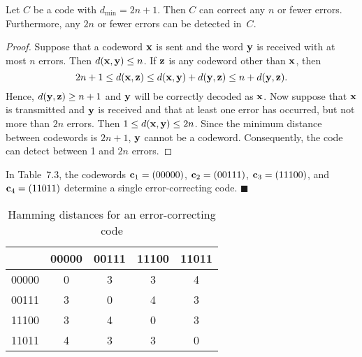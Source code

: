  
\begin{theorem}
Let $C$ be a code with $d_{\min} = 2n + 1$. Then $C$ can correct any
$n$ or fewer errors.  Furthermore, any $2n$ or fewer errors can be
detected in~$C$. 
\end{theorem}
 
 
\begin{proof}
Suppose that a codeword ${\bold x}$ is sent and the word ${\bold y}$
is received with at most $n$ errors. Then $d( {\bold x}, {\bold y})
\leq n$. If ${\bold z}$ is any codeword other than ${\bold x}$, then
\[
2n+1
\leq
d( {\bold x}, {\bold z})
\leq
d( {\bold x}, {\bold y}) + d( {\bold y}, {\bold z})
\leq
n + d( {\bold y}, {\bold z}).
\]
Hence, $d({\bold y}, {\bold z} ) \geq n+1$ and ${\bold y}$ will be
correctly decoded as ${\bold x}$. Now suppose that ${\bold x}$ is
transmitted and ${\bold y}$ is received and that at least one error 
has occurred, but not more than $2n$ errors. Then $1 \leq d( {\bold x},
{\bold y} ) \leq 2n$.  Since the minimum distance between codewords is
$2n +1$, ${\bold y}$ cannot be a codeword.  Consequently, the code can
detect between 1 and $2n$ errors. 
\end{proof}
 
 
\vspace{2ex}
 
 
In Table~7.3, the codewords ${\bold c}_1 = (00000)$, ${\bold c}_2 = (00111)$,
${\bold c}_3 = (11100)$, and ${\bold c}_4 = (11011)$ determine a
single error-correcting code.  
\hspace{\fill} $\blacksquare$
 
 
\begin{table}[htb]
\caption{ Hamming distances for an error-correcting code}{\small
\begin{center}
\begin{tabular}{|c|cccc|}
\hline
      & 00000 & 00111 & 11100 & 11011 \\ \hline
00000 & 0     & 3     & 3     & 4 \\
00111 & 3     & 0     & 4     & 3 \\
11100 & 3     & 4     & 0     & 3 \\
11011 & 4     & 3     & 3     & 0 \\
\hline
\end{tabular}
\end{center}
}
\end{table}
 
 
 
 
 
